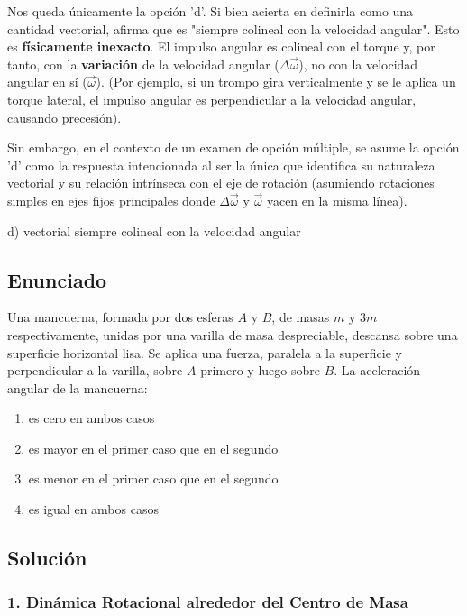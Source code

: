 \documentclass[12pt, a4paper]{article}
\begin{document}
Nos queda únicamente la opción 'd'. Si bien acierta en definirla como una cantidad vectorial, afirma que es "siempre colineal con la velocidad angular". Esto es \textbf{físicamente inexacto}. El impulso angular es colineal con el torque y, por tanto, con la \textbf{variación} de la velocidad angular ($\Delta\vec{\omega}$), no con la velocidad angular en sí ($\vec{\omega}$). (Por ejemplo, si un trompo gira verticalmente y se le aplica un torque lateral, el impulso angular es perpendicular a la velocidad angular, causando precesión).

Sin embargo, en el contexto de un examen de opción múltiple, se asume la opción 'd' como la respuesta intencionada al ser la única que identifica su naturaleza vectorial y su relación intrínseca con el eje de rotación (asumiendo rotaciones simples en ejes fijos principales donde $\Delta\vec{\omega}$ y $\vec{\omega}$ yacen en la misma línea).

\begin{tcolorbox}[colback=green!5!white, colframe=green!50!black, title=Respuesta Final]
\centering \Large d) vectorial siempre colineal con la velocidad angular
\end{tcolorbox}

\newpage

\subsection*{Enunciado}
Una mancuerna, formada por dos esferas $A$ y $B$, de masas $m$ y $3m$ respectivamente, unidas por una varilla de masa despreciable, descansa sobre una superficie horizontal lisa. Se aplica una fuerza, paralela a la superficie y perpendicular a la varilla, sobre $A$ primero y luego sobre $B$. La aceleración angular de la mancuerna:
\begin{enumerate}[label=\alph*)]
    \item es cero en ambos casos
    \item es mayor en el primer caso que en el segundo
    \item es menor en el primer caso que en el segundo
    \item es igual en ambos casos
\end{enumerate}

\subsection*{Solución}

\subsubsection*{1. Dinámica Rotacional alrededor del Centro de Masa}
\end{document}
